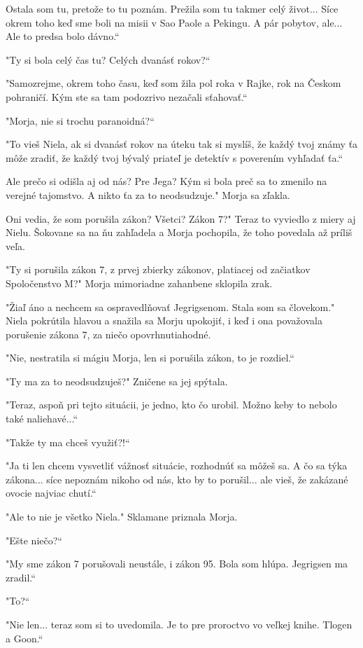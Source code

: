\documentclass{book}
\begin{document}
$ $Ostala som tu, pretože to tu poznám. Prežila som tu takmer celý život... Síce okrem toho keď sme boli na misii v Sao Paole a Pekingu. A pár pobytov, ale... Ale to predsa bolo dávno.“

"Ty si bola celý čas tu? Celých dvanásť rokov?“

"Samozrejme, okrem toho času, keď som žila pol roka v Rajke, rok na Českom pohraničí. Kým ste sa tam podozrivo nezačali sťahovať.“

"Morja, nie si trochu paranoidná?“

"To vieš Niela, ak si dvanásť rokov na úteku tak si myslíš, že každý tvoj známy ťa môže zradiť, že každý tvoj bývalý priateľ je detektív s poverením vyhľadať ťa.“

$ $Ale prečo si odišla aj od nás? Pre Jega? Kým si bola preč sa to zmenilo na verejné tajomstvo. A nikto ťa za to neodsudzuje."$ $ Morja sa zľakla.

$ $Oni vedia, že som porušila zákon? Všetci? Zákon 7?"$ $ Teraz to vyviedlo z miery aj Nielu. Šokovane sa na ňu zahľadela a Morja pochopila, že toho povedala až príliš veľa.

"Ty si porušila zákon 7, z prvej zbierky zákonov, platiacej od začiatkov Spoločenstvo M?"$ $ Morja mimoriadne zahanbene sklopila zrak.

"Žiaľ áno a nechcem sa ospravedlňovať Jegrigsenom. Stala som sa človekom."$ $ Niela pokrútila hlavou a snažila sa Morju upokojiť, i keď i ona považovala porušenie zákona 7, za niečo opovrhnutiahodné.

"Nie, nestratila si mágiu Morja, len si porušila zákon, to je rozdiel.“

"Ty ma za to neodsudzuješ?"$ $ Zničene sa jej spýtala.

"Teraz, aspoň pri tejto situácii, je jedno, kto čo urobil. Možno keby to nebolo také naliehavé...“

"Takže ty ma chceš využiť?!“

"Ja ti len chcem vysvetliť vážnosť situácie, rozhodnúť sa môžeš sa. A čo sa týka zákona... síce nepoznám nikoho od nás, kto by to porušil... ale vieš, že zakázané ovocie najviac chutí.“

"$ $Ale to nie je všetko Niela."$ $ Sklamane priznala Morja.

"$ $Ešte niečo?“

"My sme zákon 7 porušovali neustále, i zákon 95. Bola som hlúpa. Jegrigsen ma zradil.“

"To?“

"Nie len... teraz som si to uvedomila. Je to pre proroctvo vo veľkej knihe. Tlogen a Goon.“
\end{document}
